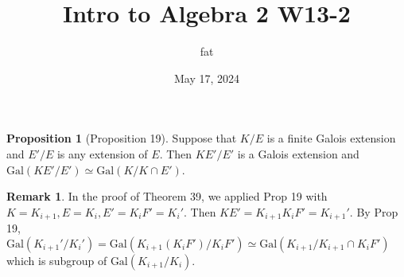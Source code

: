 \documentclass{article}
\title{Intro to Algebra 2 W13-2}
\author{fat}
\date{May 17, 2024}
\theoremstyle{definition}
\newtheorem{rem}{Remark}
\newtheorem{prop}{Proposition}
\newcommand{\Gal}{\text{Gal}}
\begin{document}
\maketitle
\thispagestyle{fancy}
\renewcommand{\footrulewidth}{0.4pt}
\cfoot{\thepage}
\renewcommand{\headrulewidth}{0.4pt}

\begin{prop}[Proposition 19]
	Suppose that $K/E$ is a finite Galois extension and $E'/E$ is any extension of $E$.
	Then $K E'/E'$ is a Galois extension and $\Gal(K E'/E') \simeq \Gal(K/K \cap E')$.
\end{prop}

\begin{rem}
	In the proof of Theorem 39, we applied Prop 19 with $K = K_{i + 1}, E = K_i, E' = K_i F' = K_i'$.
Then $K E' = K_{i + 1} K_i F' = K_{i + 1}'$.
By Prop 19, $\Gal(K_{i + 1}'/K_i') = \Gal(K_{i + 1}(K_i F')/K_i F') \simeq \Gal(K_{i + 1}/K_{i + 1} \cap K_i F')$ which is subgroup of $\Gal(K_{i + 1}/K_i)$.
\end{rem}
\end{document}
